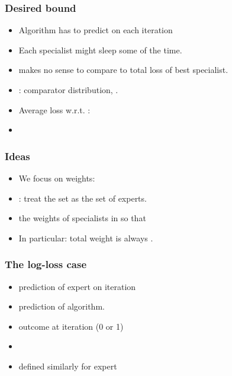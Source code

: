 \documentclass{beamer}
\begin{document}
\begin{small}
\begin{frame}
\frametitle{Desired bound}
\begin{itemize}
\item Algorithm has to predict on each iteration
\item Each specialist might sleep some of the time.
\item \R{$\Rightarrow$} makes no sense to compare to total loss of best specialist.
\item \R{$\vu$}: comparator distribution, 
.
\item Average loss w.r.t. \R{$\vu$}:
\item {} 
\end{itemize}
\end{frame}

\begin{frame}
\frametitle{Ideas}
\begin{itemize}
\item We focus on  weights: 
\item {}: treat the set  as the set of experts.
\item {} the weights of specialists in  so that
\R{\[
\sum_{i\in E^t} v_i^t = \sum_{i\in E^t} v_i^{t+1}
\]}
\item
In particular: total weight is always .
\end{itemize}
\end{frame} 

\begin{frame}
\frametitle{The log-loss case}
\begin{itemize}
\item {} prediction of expert  on iteration 
\item {} prediction of algorithm.
\item {} outcome at iteration  (0 or 1) 
\item 
{}
\item {} defined similarly for expert 
\end{itemize}
\end{frame}


\end{small}
\end{document}
